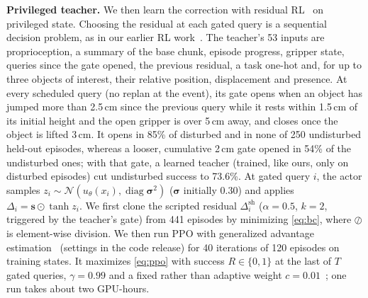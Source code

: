 \documentclass[conference,a4paper]{IEEEtran}
\begin{document}
\noindent\textbf{Privileged teacher.}
We then learn the correction with residual RL~\cite{johannink2019residual} on privileged state. Choosing the residual at each gated query is a sequential decision problem, as in our earlier RL work~\cite{ji2026hrl,ji2024sparse,ji2026agentic}. The teacher's 53 inputs are proprioception, a summary of the base chunk, episode progress, gripper state, queries since the gate opened, the previous residual, a task one-hot and, for up to three objects of interest, their relative position, displacement and presence. At every scheduled query (no replan at the event), its gate
opens when an object has jumped more than 2.5\,cm since the previous query
while it rests within 1.5\,cm of its initial height and the open gripper is over 5\,cm away, and closes once the object is lifted 3\,cm. It
opens in 85\% of disturbed and in none of 250 undisturbed held-out episodes,
whereas a looser, cumulative 2\,cm gate opened in 54\% of the undisturbed ones; with that gate, a learned teacher (trained, like ours, only on disturbed episodes) cut undisturbed
success to 73.6\%. At gated query $i$, the actor samples $z_i\sim\mathcal{N}(u_\theta(x_i),\operatorname{diag}\boldsymbol{\sigma}^2)$ ($\boldsymbol{\sigma}$ initially 0.30) and applies $\Delta_i=\mathbf{s}\odot\tanh z_i$. We first clone the scripted residual $\Delta^{\mathrm{sh}}_i$ ($\alpha=0.5$, $k=2$, triggered by the teacher's gate) from 441 episodes by minimizing \eqref{eq:bc}, where $\oslash$ is element-wise division. We then run PPO with generalized advantage estimation~\cite{schulman2016gae} (settings in the code release) for 40 iterations of 120 episodes on training states. It maximizes \eqref{eq:ppo} with success $R\in\{0,1\}$ at the last of $T$ gated queries, $\gamma=0.99$ and a fixed rather than adaptive weight $c=0.01$~\cite{ji2026moreward,hwang2026arw}; one run takes about two GPU-hours.
\end{document}
